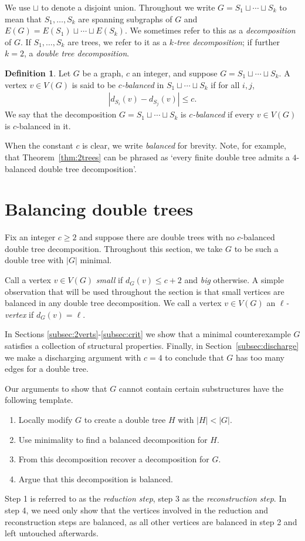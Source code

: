 \documentclass[11pt, reqno, a4paper]{article}
\theoremstyle{definition}
\newtheorem*{definition*}{Definition}
\numberwithin{equation}{section}
\renewcommand{\leq}{\leqslant}
\renewcommand{\geq}{\geqslant}
\begin{document}
We use \(\sqcup\) to denote a disjoint union.
Throughout we write $G = S_1\sqcup\dotsb\sqcup S_k$ to mean that $S_1,\dotsc,S_k$ are spanning subgraphs of $G$ and $E(G)= E(S_1)\sqcup \dotsb\sqcup E(S_k)$.
We sometimes refer to this as a \emph{decomposition} of $G$.
If $S_1,\dotsc,S_k$ are trees, we refer to it as a \emph{$k$-tree decomposition}; if further $k=2$, a \emph{double tree decomposition}.
\begin{definition*}
Let $G$ be a graph, $c$ an integer, and suppose $G = S_1 \sqcup\dotsb \sqcup S_k$.
A vertex $v\in V(G)$ is said to be \emph{$c$-balanced} in $S_1\sqcup \dotsb\sqcup S_k$ if for all $i,j$,
\begin{align*} 
|d_{S_i} (v) - d_{S_j} (v) | \leq c.
\end{align*}
We say that the decomposition $G = S_1 \sqcup \dotsb \sqcup S_k$ is \emph{$c$-balanced} if every $v\in V(G)$ is $c$-balanced in it. 
\end{definition*}
When the constant $c$ is clear, we write \emph{balanced} for brevity. Note, for example, that Theorem~\ref{thm:2trees} can be phrased as `every finite double tree admits a $4$-balanced double tree decomposition'.

\section{Balancing double trees}\label{sec:main}

Fix an integer $c\geq 2$ and suppose there are double trees with no \(c\)-balanced double tree decomposition. Throughout this section, we take \(G\) to be such a double tree with \(\lvert G\rvert\) minimal.

Call a vertex $v\in V(G)$ \textit{small} if $d_G(v) \leq c+2$ and \textit{big} otherwise.
A simple observation that will be used throughout the section is that small vertices are balanced in any double tree decomposition.
We call a vertex $v\in V(G)$ an \mbox{\textit{$\ell$-vertex}} if $d_G(v) = \ell$.

In Sections \ref{subsec:2verts}-\ref{subsec:crit} we show that a minimal counterexample $G$ satisfies a collection of structural properties.
Finally, in Section~\ref{subsec:discharge} we make a discharging argument with $c=4$ to conclude that $G$ has too many edges for a double tree.

Our arguments to show that $G$ cannot contain certain substructures have the following template.
\begin{enumerate}[noitemsep]
\item Locally modify $G$ to create a double tree $H$ with $|H|<|G|$.
\item Use minimality to find a balanced decomposition for $H$.
\item From this decomposition recover a decomposition for $G$.
\item Argue that this decomposition is balanced.
\end{enumerate}
Step 1 is referred to as the \emph{reduction step}, step 3 as the \emph{reconstruction step}.
In step 4, we need only show that the vertices involved in the reduction and reconstruction steps are balanced, as all other vertices are balanced in step 2 and left untouched afterwards.
\end{document}
